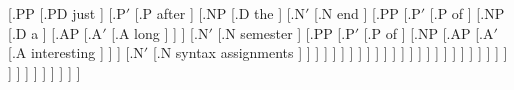 \documentclass{article}
\begin{document}
\begin{landscape}
{                            [.PP [.PD just ]
                                 [.P$'$ [.{P\degree} after ]
                                        [.NP [.D the ] [.N$'$   [.{N\degree\textsubscript{\rbrack}} end ]
                                                                [.PP [.P$'$ [.{P\degree} of ]
                                                                            [.NP [.D a ]
                                                                                [.AP [.A$'$ [.{A\degree} long ] ] ]
                                                                                [.N$'$ [.{N\degree\textsubscript{\rbrack}} semester ]
                                                                                        [.PP [.P$'$ [.{P\degree} of ]
                                                                                                    [.NP [.AP [.A$'$ [.{A\degree} interesting ] ] ]
                                                                                                         [.N$'$ [.{N\degree\textsubscript{\rbrack}} {syntax assignments} ] ] ] ] ] ] ] ] ] ] ] ] ] ] ] ] ] ] ] ] ] ] ] ] ] ] ] ] ] ] ] ] ] ]
}

\end{landscape}
\end{document}
